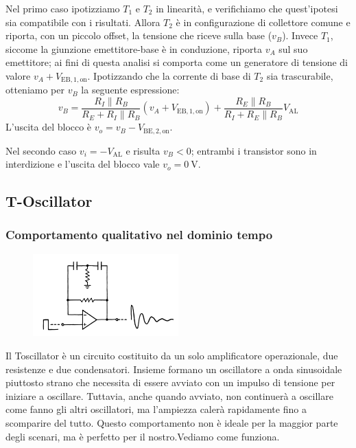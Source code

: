 \documentclass{article}
\newcommand{\var}[2]{#1_\mathrm{#2}}
\theoremstyle{definition}
\begin{document}
Nel primo caso ipotizziamo \(T_1\) e \(T_2\) in linearità, e verifichiamo che quest'ipotesi sia compatibile con i risultati.
Allora \(T_2\) è in configurazione di collettore comune e riporta, con un piccolo offset, la tensione che riceve sulla base (\(v_B\)).
Invece \(T_1\), siccome la giunzione emettitore-base è in conduzione, riporta \(v_A\) sul suo emettitore;
ai fini di questa analisi si comporta come un generatore di tensione di valore \(v_A + \var{V}{EB,1,on}\).
Ipotizzando che la corrente di base di \(T_2\) sia trascurabile, otteniamo per \(v_B\) la seguente espressione:
%
\begin{equation}
    v_B = \frac{R_I \parallel R_B}{R_E + R_I \parallel R_B} \left(v_A + \var{V}{EB,1,on} \right) +
    \frac{R_E \parallel R_B}{R_I + R_E \parallel R_B} \var{V}{AL}
\end{equation}
%
L'uscita del blocco è \(v_o = v_B - \var{V}{BE,2,on}\).

Nel secondo caso \(v_i = -\var{V}{AL}\) e risulta \(v_B < 0 \); entrambi i transistor sono in interdizione e l'uscita del blocco vale \(v_o = \qty{0}{\volt}\).


\subsection{T-Oscillator}
\subsubsection{Comportamento qualitativo nel dominio tempo}
\begin{figure}[ht]
    \centering
    \includegraphics[width=0.5\textwidth]{../images/Toscillator.png} 
    \label{fig:Toscillator}
\end{figure}

Il Toscillator è un circuito costituito da un solo amplificatore operazionale, due resistenze e due condensatori. Insieme formano un oscillatore a onda sinusoidale piuttosto strano che necessita di essere avviato con un impulso di tensione per iniziare a oscillare.
Tuttavia, anche quando avviato, non continuerà a oscillare come fanno gli altri oscillatori, ma l'ampiezza calerà rapidamente fino a scomparire del tutto. Questo comportamento non è ideale per la maggior parte degli scenari, ma è perfetto per il nostro.Vediamo come funziona.
\end{document}

